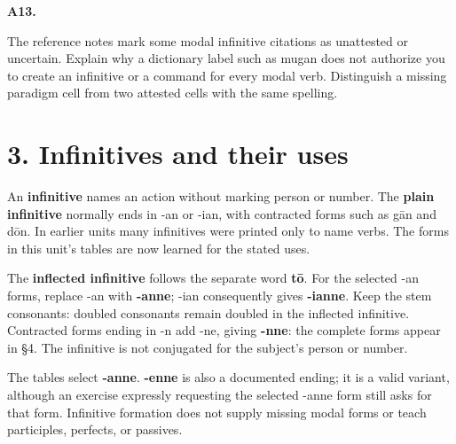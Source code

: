 \par\begin{minipage}{\linewidth}\raggedright
\textbf{A13.}

The reference notes mark some modal infinitive citations as unattested or uncertain. Explain why a dictionary label such as mugan does not authorize you to create an infinitive or a command for every modal verb. Distinguish a missing paradigm cell from two attested cells with the same spelling.

\end{minipage}\par\addvspace{4pt}

\section*{3. Infinitives and their uses}

An \textbf{infinitive} names an action without marking person or number. The \textbf{plain infinitive} normally ends in -an or -ian, with contracted forms such as gān and dōn. In earlier units many infinitives were printed only to name verbs. The forms in this unit’s tables are now learned for the stated uses.

The \textbf{inflected infinitive} follows the separate word \textbf{tō}. For the selected -an forms, replace -an with \textbf{-anne}; -ian consequently gives \textbf{-ianne}. Keep the stem consonants: doubled consonants remain doubled in the inflected infinitive. Contracted forms ending in -n add -ne, giving \textbf{-nne}: the complete forms appear in §4. The infinitive is not conjugated for the subject’s person or number.

The tables select \textbf{-anne}. \textbf{-enne} is also a documented ending; it is a valid variant, although an exercise expressly requesting the selected -anne form still asks for that form. Infinitive formation does not supply missing modal forms or teach participles, perfects, or passives.

